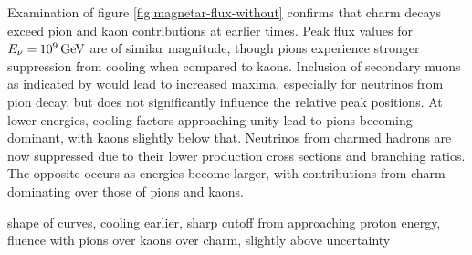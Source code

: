 Examination of figure \ref{fig:magnetar-flux-without} confirms that charm decays exceed pion and kaon contributions at earlier times.
Peak flux values for $E_\nu = \kern-0.5pt \qty{e9}{\giga\electronvolt}$ are of similar magnitude, though pions experience stronger
suppression from cooling when compared to kaons. Inclusion of secondary muons as indicated by \cite{Carpio_2020} would
lead to increased maxima, especially for neutrinos from pion decay, but does not significantly influence the relative peak positions.
At lower energies, cooling factors approaching unity lead to pions becoming dominant, with kaons slightly below that. Neutrinos
from charmed hadrons are now suppressed due to their lower production cross sections and branching ratios. The opposite occurs as
energies become larger, with contributions from charm dominating over those of pions and kaons.

shape of curves, cooling earlier, sharp cutoff from approaching proton energy, fluence with pions over kaons over charm, slightly above uncertainty



